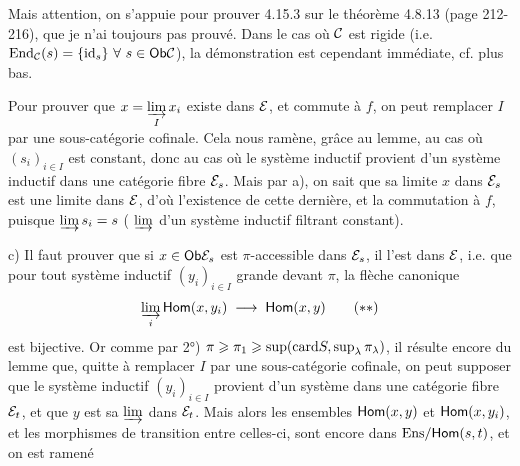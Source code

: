 Mais attention, on s'appuie pour prouver 4.15.3 sur le théorème 4.8.13 (page 212-216), que je n'ai toujours pas prouvé. Dans le cas où $\mathcal{C}$ est rigide (i.e. $\operatorname{End}_{\mathcal{C}}(s) = \{\mathrm{id}_s\}\ \forall\ s \in \mathsf{Ob}\mathcal{C}$), la démonstration est cependant immédiate, cf. plus bas.

Pour prouver que $x = \varinjlim\limits_{I} x_i$ existe dans $\mathcal{E}$, et commute à $f$, on peut remplacer $I$ par une sous-catégorie cofinale. Cela nous ramène, grâce au lemme, au cas où $(s_i)_{i\in I}$ est constant, donc au cas où le système inductif provient d'un système inductif dans une catégorie fibre $\mathcal{E}_s$. Mais par a), on sait que sa limite $x$ dans $\mathcal{E}_s$ est une limite dans $\mathcal{E}$, d'où l'existence de cette dernière, et la commutation à $f$, puisque $\varinjlim s_i = s$ ( $\varinjlim$ d'un système inductif filtrant constant).

c) Il faut prouver que si $x \in \mathsf{Ob}\mathcal{E}_s$ est $\pi$-accessible dans $\mathcal{E}_s$, il l'est dans $\mathcal{E}$, i.e. que pour tout système inductif $(y_i)_{i\in I}$ grande devant $\pi$, la flèche canonique
\[
\varinjlim_{i} \Hom(x,y_i) \;\longrightarrow\; \Hom(x,y) \tag*{$(**)$}
\]
est bijective. Or comme par 2°) $\pi \geqslant \pi_1 \geqslant \sup(\mathrm{card} S, \sup_\lambda \pi_\lambda)$, il résulte encore du lemme %
que, quitte à remplacer $I$ par une sous-catégorie cofinale, on peut supposer que le système inductif $(y_i)_{i\in I}$ provient d'un système dans une catégorie fibre $\mathcal{E}_t$, et que $y$ est sa $\varinjlim$ dans $\mathcal{E}_t$. Mais alors les ensembles $\mathsf{Hom}(x,y)$ et $\mathsf{Hom}(x,y_i)$, et les morphismes de transition entre celles-ci, sont encore dans $\mathrm{Ens}/\mathsf{Hom}(s,t)$, et on est ramené


